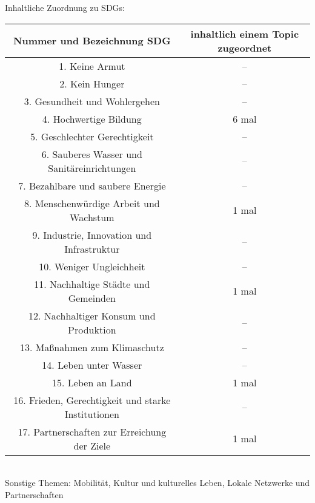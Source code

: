 \documentclass[letterpaper]{article}
\begin{document}
Inhaltliche Zuordnung zu SDGs: \\
\begin{tabular}{ |c|c|}

\hline
Nummer und Bezeichnung SDG & inhaltlich einem Topic zugeordnet\\
\hline
1. Keine Armut & -- \\ 
\hline 
2. Kein Hunger & -- \\
\hline
3. Gesundheit und Wohlergehen & -- \\
\hline
4. Hochwertige Bildung & 6 mal \\
\hline 
5. Geschlechter Gerechtigkeit & -- \\
\hline
6. Sauberes Wasser und Sanitäreinrichtungen & -- \\
\hline
7. Bezahlbare und saubere Energie & -- \\
\hline 
8. Menschenwürdige Arbeit und Wachstum & 1 mal \\
\hline 
9. Industrie, Innovation und Infrastruktur & -- \\
\hline 
10. Weniger Ungleichheit & -- \\
\hline 
11. Nachhaltige Städte und Gemeinden & 1 mal \\
\hline 
12. Nachhaltiger Konsum und Produktion & -- \\
\hline 
13. Maßnahmen zum Klimaschutz & -- \\
\hline 
14. Leben unter Wasser & -- \\
\hline 
15. Leben an Land & 1 mal \\
\hline 
16. Frieden, Gerechtigkeit und starke Institutionen & -- \\
\hline 
17. Partnerschaften zur Erreichung der Ziele & 1 mal \\
\hline 
\end{tabular}\\
Sonstige Themen: Mobilität, Kultur und kulturelles Leben, Lokale Netzwerke und Partnerschaften
\end{document}
